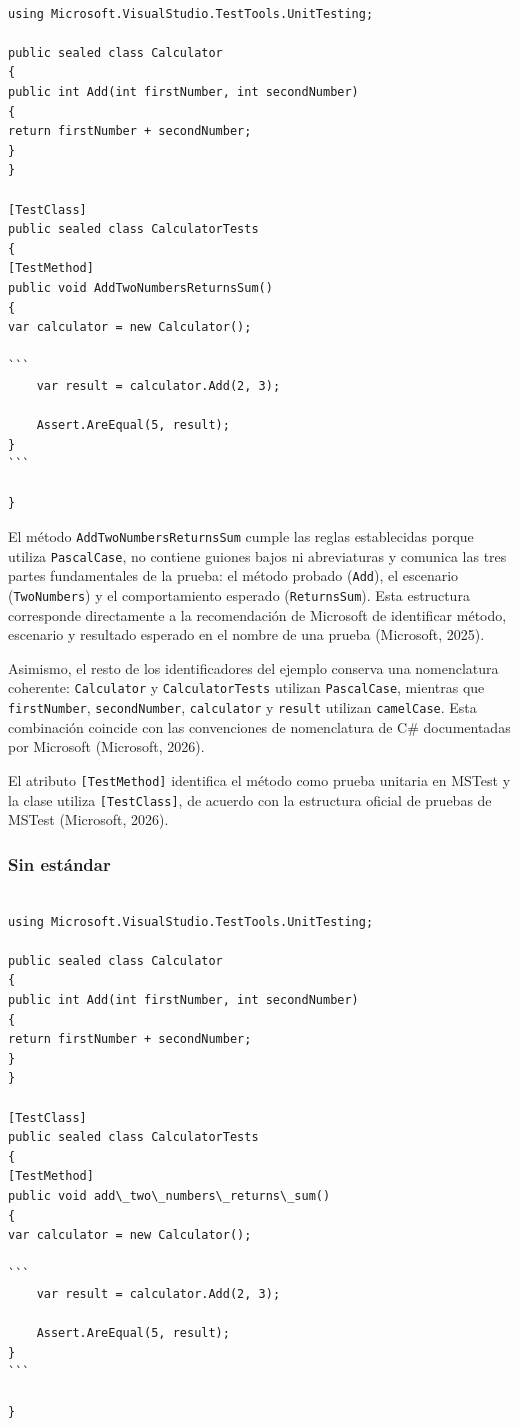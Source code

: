 \begin{lstlisting}[style=csharpstyle]

using Microsoft.VisualStudio.TestTools.UnitTesting;

public sealed class Calculator
{
public int Add(int firstNumber, int secondNumber)
{
return firstNumber + secondNumber;
}
}

[TestClass]
public sealed class CalculatorTests
{
[TestMethod]
public void AddTwoNumbersReturnsSum()
{
var calculator = new Calculator();

```
    var result = calculator.Add(2, 3);

    Assert.AreEqual(5, result);
}
```

}

\end{lstlisting}

El método \texttt{AddTwoNumbersReturnsSum} cumple las reglas establecidas porque utiliza \texttt{PascalCase}, no contiene guiones bajos ni abreviaturas y comunica las tres partes fundamentales de la prueba: el método probado (\texttt{Add}), el escenario (\texttt{TwoNumbers}) y el comportamiento esperado (\texttt{ReturnsSum}). Esta estructura corresponde directamente a la recomendación de Microsoft de identificar método, escenario y resultado esperado en el nombre de una prueba (Microsoft, 2025).

Asimismo, el resto de los identificadores del ejemplo conserva una nomenclatura coherente: \texttt{Calculator} y \texttt{CalculatorTests} utilizan \texttt{PascalCase}, mientras que \texttt{firstNumber}, \texttt{secondNumber}, \texttt{calculator} y \texttt{result} utilizan \texttt{camelCase}. Esta combinación coincide con las convenciones de nomenclatura de C\# documentadas por Microsoft (Microsoft, 2026).

El atributo \texttt{[TestMethod]} identifica el método como prueba unitaria en MSTest y la clase utiliza \texttt{[TestClass]}, de acuerdo con la estructura oficial de pruebas de MSTest (Microsoft, 2026).

\subsubsection{Sin estándar}

\begin{lstlisting}[style=csharpstyle]

using Microsoft.VisualStudio.TestTools.UnitTesting;

public sealed class Calculator
{
public int Add(int firstNumber, int secondNumber)
{
return firstNumber + secondNumber;
}
}

[TestClass]
public sealed class CalculatorTests
{
[TestMethod]
public void add\_two\_numbers\_returns\_sum()
{
var calculator = new Calculator();

```
    var result = calculator.Add(2, 3);

    Assert.AreEqual(5, result);
}
```

}

\end{lstlisting}

